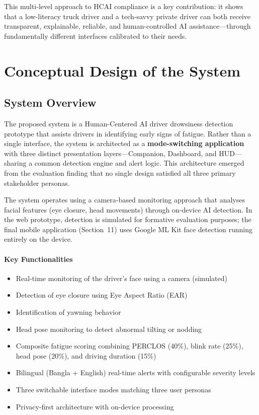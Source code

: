 \documentclass[sigconf]{acmart}
\begin{document}
This multi-level approach to HCAI compliance is a key contribution: it shows that a low-literacy truck driver and a tech-savvy private driver can both receive transparent, explainable, reliable, and human-controlled AI assistance---through fundamentally different interfaces calibrated to their needs.


\section{Conceptual Design of the System}

\subsection{System Overview}
The proposed system is a Human-Centered AI driver drowsiness detection prototype that assists drivers in identifying early signs of fatigue. Rather than a single interface, the system is architected as a \textbf{mode-switching application} with three distinct presentation layers---Companion, Dashboard, and HUD---sharing a common detection engine and alert logic. This architecture emerged from the evaluation finding that no single design satisfied all three primary stakeholder personas.

The system operates using a camera-based monitoring approach that analyses facial features (eye closure, head movements) through on-device AI detection. In the web prototype, detection is simulated for formative evaluation purposes; the final mobile application (Section~11) uses Google ML Kit face detection running entirely on the device.

\paragraph{Key Functionalities}
\begin{itemize}
    \item Real-time monitoring of the driver's face using a camera (simulated)
    \item Detection of eye closure using Eye Aspect Ratio (EAR)
    \item Identification of yawning behavior
    \item Head pose monitoring to detect abnormal tilting or nodding
    \item Composite fatigue scoring combining PERCLOS (40\%), blink rate (25\%), head pose (20\%), and driving duration (15\%)
    \item Bilingual (Bangla + English) real-time alerts with configurable severity levels
    \item Three switchable interface modes matching three user personas
    \item Privacy-first architecture with on-device processing
\end{itemize}
\end{document}

